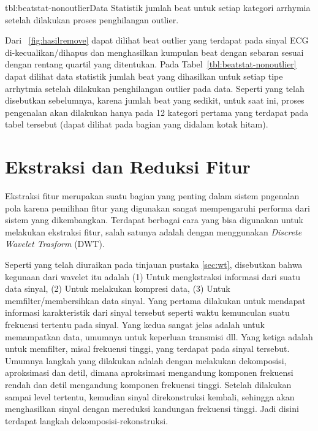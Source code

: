{tbl:beatstat-nonoutlier}{Data Statistik jumlah beat untuk setiap  kategori
arrhymia setelah dilakukan proses penghilangan outlier.}

Dari \pic~\ref{fig:hasilremove} dapat dilihat beat outlier yang terdapat pada
sinyal ECG di-kecualikan/dihapus dan menghasilkan kumpulan beat dengan sebaran
sesuai dengan rentang quartil yang ditentukan. Pada
Tabel~\ref{tbl:beatstat-nonoutlier} dapat dilihat data statistik jumlah beat
yang dihasilkan untuk setiap tipe arrhytmia setelah dilakukan penghilangan outlier
pada data. Seperti yang telah disebutkan sebelumnya, karena jumlah beat yang
sedikit, untuk saat ini, proses pengenalan akan dilakukan hanya pada 12 kategori
pertama yang terdapat pada tabel tersebut (dapat dilihat pada bagian yang
didalam kotak hitam).



\section{Ekstraksi dan Reduksi Fitur}
Ekstraksi fitur merupakan suatu bagian yang penting dalam sistem pngenalan pola
karena pemilihan fitur yang digunakan sangat mempengaruhi performa dari sistem
yang dikembangkan. Terdapat berbagai cara yang bisa digunakan untuk melakukan
ekstraksi fitur, salah satunya adalah dengan menggunakan \emph{Discrete Wavelet
Trasform} (DWT). 

Seperti yang telah diuraikan pada tinjauan pustaka \ref{sec:wt}, disebutkan
bahwa kegunaan dari wavelet itu adalah (1) Untuk mengkstraksi informasi dari
suatu data sinyal, (2) Untuk melakukan kompresi data, (3) Untuk
memfilter/membersihkan data sinyal. Yang pertama dilakukan untuk mendapat
informasi karakteristik dari sinyal tersebut seperti waktu kemunculan suatu
frekuensi tertentu pada sinyal. Yang kedua sangat jelas adalah untuk memampatkan
data, umumnya untuk keperluan transmisi dll. Yang ketiga adalah untuk memfilter,
misal frekuensi tinggi, yang terdapat pada sinyal tersebut. Umumnya langkah yang
dilakukan adalah dengan melakukan dekomposisi, aproksimasi dan detil, dimana
aproksimasi mengandung komponen frekuensi rendah dan detil mengandung komponen
frekuensi tinggi. Setelah dilakukan sampai level tertentu, kemudian sinyal
direkonstruksi kembali, sehingga akan menghasilkan sinyal dengan mereduksi
kandungan frekuensi tinggi. Jadi disini terdapat langkah
dekomposisi-rekonstruksi.

